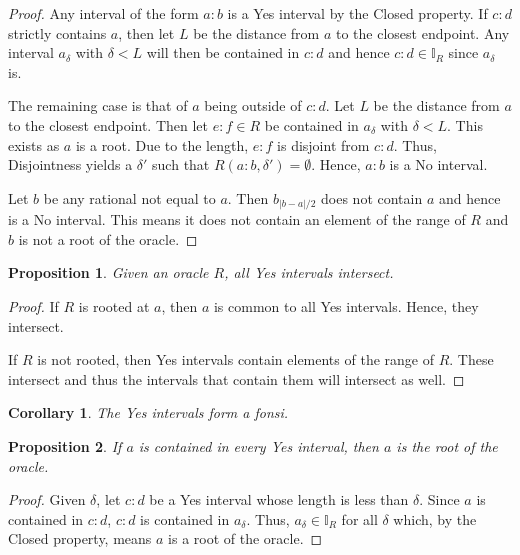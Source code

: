 \documentclass[12pt]{article}
\newtheorem{corollary}{Corollary}[section]
\newtheorem{proposition}{Proposition}[section]
\begin{document}
\begin{proof}
    Any interval of the form $a:b$ is a Yes interval by the Closed property. If $c:d$ strictly contains $a$, then let $L$ be the distance from $a$ to the closest endpoint. Any interval $a_\delta$ with $\delta < L $ will then be contained in $c:d$ and hence $c:d \in \mathbb{I}_R$ since $a_\delta$ is. 

    The remaining case is that of $a$ being outside of $c:d$. Let $L$ be the distance from $a$ to the closest endpoint. Then let $e:f \in R$ be contained in $a_{\delta}$ with $\delta < L$. This exists as $a$ is a root. Due to the length, $e:f$ is disjoint from $c:d$. Thus, Disjointness yields a $\delta'$ such that $R(a:b, \delta')= \emptyset$. Hence, $a:b$ is a No interval. 

    Let $b$ be any rational not equal to $a$. Then $b_{|b-a|/2}$ does not contain $a$ and hence is a No interval. This means it does not contain an element of the range of $R$ and $b$ is not a root of the oracle. 
\end{proof}

\begin{proposition}
    Given an oracle $R$, all Yes intervals intersect. 
\end{proposition}

\begin{proof}
    If $R$ is rooted at $a$, then $a$ is common to all Yes intervals. Hence, they intersect. 

    If $R$ is not rooted, then Yes intervals contain elements of the range of $R$. These intersect and thus the intervals that contain them will intersect as well. 
\end{proof}


\begin{corollary}
    The Yes intervals form a fonsi. 
\end{corollary}

\begin{proposition}\label{os:root}
    If $a$ is contained in every Yes interval, then $a$ is the root of the oracle. 
\end{proposition}

\begin{proof}
    Given $\delta$, let $c:d$ be a Yes interval whose length is less than $\delta$. Since $a$ is contained in $c:d$, $c:d$ is contained in $a_\delta$. Thus, $a_\delta \in \mathbb{I}_R$ for all $\delta$ which, by the Closed property, means $a$ is a root of the oracle. 
\end{proof}
\end{document}
